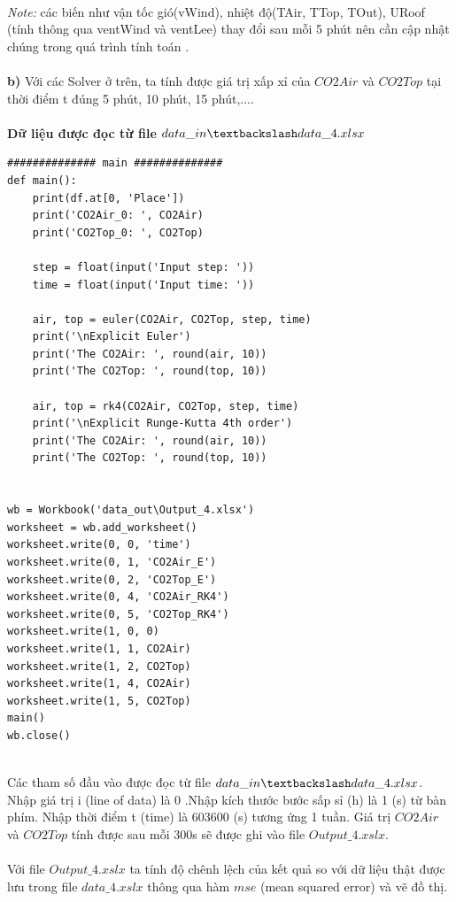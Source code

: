 \documentclass[a4paper]{article}
\begin{document}
\\
    \textit{Note: } các biến như vận tốc gió(vWind), nhiệt độ(TAir, TTop, TOut), URoof (tính thông qua ventWind và ventLee) thay đổi sau mỗi 5 phút nên cần cập nhật chúng trong quá trình tính toán .
\\\\
\textbf{b)}
Với các Solver ở trên, ta tính được giá trị xấp xỉ của $CO2Air$ và $CO2Top$ tại thời điểm t đúng 5 phút, 10 phút, 15 phút,....
\\\\
\textbf{Dữ liệu được đọc từ file $data\_in\textbackslash data\_4.xlsx$} \\
\begin{verbatim}
############## main ##############
def main():
    print(df.at[0, 'Place'])
    print('CO2Air_0: ', CO2Air)
    print('CO2Top_0: ', CO2Top)

    step = float(input('Input step: '))
    time = float(input('Input time: '))

    air, top = euler(CO2Air, CO2Top, step, time)
    print('\nExplicit Euler')
    print('The CO2Air: ', round(air, 10))
    print('The CO2Top: ', round(top, 10))

    air, top = rk4(CO2Air, CO2Top, step, time)
    print('\nExplicit Runge-Kutta 4th order')
    print('The CO2Air: ', round(air, 10))
    print('The CO2Top: ', round(top, 10))


wb = Workbook('data_out\Output_4.xlsx')
worksheet = wb.add_worksheet()
worksheet.write(0, 0, 'time')
worksheet.write(0, 1, 'CO2Air_E')
worksheet.write(0, 2, 'CO2Top_E')
worksheet.write(0, 4, 'CO2Air_RK4')
worksheet.write(0, 5, 'CO2Top_RK4')
worksheet.write(1, 0, 0)
worksheet.write(1, 1, CO2Air)
worksheet.write(1, 2, CO2Top)
worksheet.write(1, 4, CO2Air)
worksheet.write(1, 5, CO2Top)
main()
wb.close()
\end{verbatim}
\\
Các tham số đầu vào được đọc từ file $data\_in\textbackslash data\_4.xlsx$. Nhập giá trị i (line of data) là 0 .Nhập kích thước bước sấp sỉ (h) là 1 (s) từ bàn phím. Nhập thời điểm t (time) là 603600 (s) tương ứng 1 tuần. Giá trị $CO2Air$ và $CO2Top$ tính được sau mỗi 300s sẽ được ghi vào file $Output\_4.xslx$.
\\\\
Với file $Output\_4.xslx$ ta tính độ chênh lệch của kết quả so với dữ liệu thật được lưu trong file $data\_4.xslx$ thông qua hàm $mse$ (mean squared error) và vẽ đồ thị.
\end{document}
